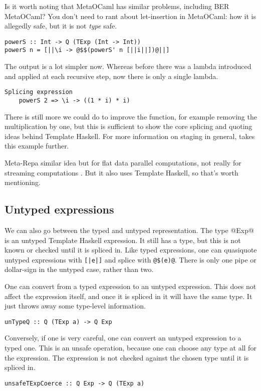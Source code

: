 Is it worth noting that MetaOCaml has similar problems, including BER MetaOCaml?
You don't need to rant about let-insertion in MetaOCaml: how it is allegedly safe, but it is not \emph{type} safe.

\begin{lstlisting}
powerS :: Int -> Q (TExp (Int -> Int))
powerS n = [||\i -> @$$(powerS' n [||i||])@||]
\end{lstlisting}

The output is a lot simpler now.
Whereas before there was a lambda introduced and applied at each recursive step, now there is only a single lambda.

\begin{lstlisting}
Splicing expression
    powerS 2 => \i -> ((1 * i) * i)
\end{lstlisting}

There is still more we could do to improve the function, for example removing the multiplication by one, but this is sufficient to show the core splicing and quoting ideas behind Template Haskell.
For more information on staging in general, \citet{rompf2010lightweight} takes this example further.

Meta-Repa similar idea but for flat data parallel computations, not really for streaming computations \cite{ankner2013edsl}.
But it also uses Template Haskell, so that's worth mentioning.

\subsection{Untyped expressions}
We can also go between the typed and untyped representation.
The type @Exp@ is an untyped Template Haskell expression.
It still has a type, but this is not known or checked until it is spliced in.
Like typed expressions, one can quasiquote untyped expressions with \lstinline/[|e|]/ and splice with \lstinline/@$(e)@/.
There is only one pipe or dollar-sign in the untyped case, rather than two.

One can convert from a typed expression to an untyped expression.
This does not affect the expression itself, and once it is spliced in it will have the same type.
It just throws away some type-level information.

\begin{lstlisting}
unTypeQ :: Q (TExp a) -> Q Exp
\end{lstlisting}

Conversely, if one is very careful, one can convert an untyped expression to a typed one.
This is an unsafe operation, because one can choose any type at all for the expression.
The expression is not checked against the chosen type until it is spliced in.
\begin{lstlisting}
unsafeTExpCoerce :: Q Exp -> Q (TExp a)
\end{lstlisting}

